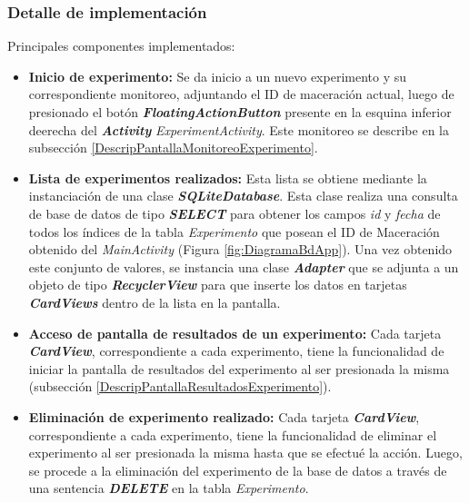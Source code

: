             \subsubsection{Detalle de implementación}
                \par Principales componentes implementados:
                \begin{itemize}
                    \item \textbf{Inicio de experimento:} Se da inicio a un nuevo experimento y su correspondiente monitoreo, adjuntando el ID de maceración actual, luego de presionado el botón \textbf{\textit{\gls{FloatingActionButton}}} presente en la esquina inferior deerecha del \textbf{\textit{Activity}} \textit{ExperimentActivity}. Este monitoreo se describe en la subsección \ref{DescripPantallaMonitoreoExperimento}.
                    
                    \item \textbf{Lista de experimentos realizados:} Esta lista se obtiene mediante la instanciación de una clase \textbf{\textit{\gls{SQLiteDatabase}}}. Esta clase realiza una consulta de base de datos de tipo \textbf{\textit{\gls{SELECT}}} para obtener los campos \textit{id} y \textit{fecha} de todos los índices de la tabla \textit{Experimento} que posean el ID de Maceración obtenido del \textit{MainActivity}  (Figura \ref{fig:DiagramaBdApp}). Una vez obtenido este conjunto de valores, se instancia una clase \textbf{\textit{\gls{Adapter}}} que se adjunta a un objeto de tipo \textbf{\textit{\gls{RecyclerView}}} para que inserte los datos en tarjetas \textbf{\textit{\gls{CardView}s}} dentro de la lista en la pantalla. 
                    
                    \item \textbf{Acceso de pantalla de resultados de un experimento:} Cada tarjeta \textbf{\textit{\gls{CardView}}}, correspondiente a cada experimento, tiene la funcionalidad de iniciar la pantalla de resultados del experimento al ser presionada la misma (subsección \ref{DescripPantallaResultadosExperimento}).
                  
                    \item \textbf{Eliminación de experimento realizado:} Cada tarjeta \textbf{\textit{\gls{CardView}}}, correspondiente a cada experimento, tiene la funcionalidad de eliminar el experimento al ser presionada la misma hasta que se efectué la acción. Luego, se procede a la eliminación del experimento de la base de datos a través de una sentencia \textbf{\textit{\gls{DELETE}}} en la tabla \textit{Experimento}.
                    

\end{itemize}
